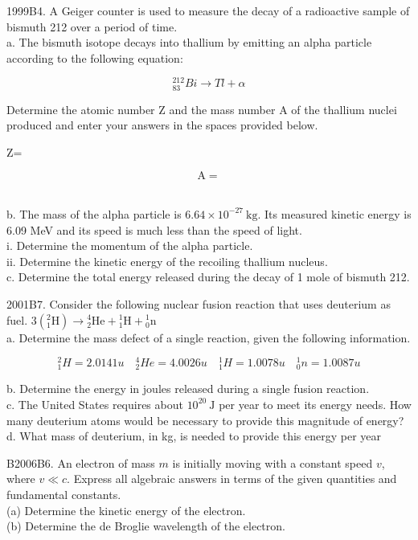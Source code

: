 \begin{enumerate}
1999B4. A Geiger counter is used to measure the decay of a radioactive sample of bismuth 212 over a period of time.\\
a. The bismuth isotope decays into thallium by emitting an alpha particle according to the following equation:

$$
{ }_{83}^{212} B i \rightarrow T l+\alpha
$$

Determine the atomic number Z and the mass number A of the thallium nuclei produced and enter your answers in the spaces provided below.

Z= $\qquad$

$$
\mathrm{A}=
$$

$\qquad$\\
b. The mass of the alpha particle is $6.64 \times 10^{-27} \mathrm{~kg}$. Its measured kinetic energy is 6.09 MeV and its speed is much less than the speed of light.\\
i. Determine the momentum of the alpha particle.\\
ii. Determine the kinetic energy of the recoiling thallium nucleus.\\
c. Determine the total energy released during the decay of 1 mole of bismuth 212.

2001B7. Consider the following nuclear fusion reaction that uses deuterium as fuel. $3\left({ }_{1}^{2} \mathrm{H}\right) \rightarrow{ }_{2}^{4} \mathrm{He}+{ }_{1}^{1} \mathrm{H}+{ }_{0}^{1} \mathrm{n}$\\
a. Determine the mass defect of a single reaction, given the following information.

$$
{ }_{1}^{2} H=2.0141 u \quad{ }_{2}^{4} H e=4.0026 u \quad{ }_{1}^{1} H=1.0078 u \quad{ }_{0}^{1} n=1.0087 u
$$

b. Determine the energy in joules released during a single fusion reaction.\\
c. The United States requires about $10^{20} \mathrm{~J}$ per year to meet its energy needs. How many deuterium atoms would be necessary to provide this magnitude of energy?\\
d. What mass of deuterium, in kg, is needed to provide this energy per year

B2006B6. An electron of mass $m$ is initially moving with a constant speed $v$, where $v \ll c$. Express all algebraic answers in terms of the given quantities and fundamental constants.\\
(a) Determine the kinetic energy of the electron.\\
(b) Determine the de Broglie wavelength of the electron.


\end{enumerate}
